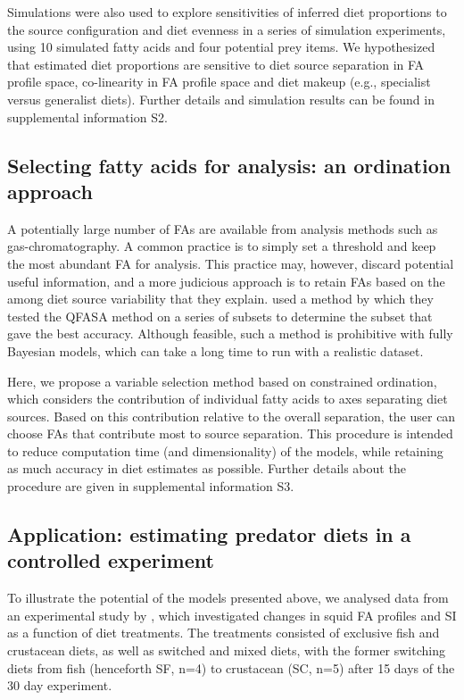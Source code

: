 \documentclass[fleqn,10pt]{wlpeerj}
\begin{document}
Simulations were also used to explore sensitivities of inferred diet proportions to the source
configuration and diet evenness in a series of
simulation experiments, using 10 simulated fatty acids and four potential prey items. We hypothesized that estimated diet
proportions are sensitive to diet source separation in FA profile space,
co-linearity in FA profile space \citep{blanchard_inference_2011} and diet makeup (e.g., specialist versus 
generalist diets). Further details and simulation results can be found
in supplemental information S2.

\subsection*{Selecting fatty acids for analysis: an ordination approach}

A potentially large number of FAs are available from analysis methods
such as gas-chromatography. A common practice is to simply set a
threshold and keep the most abundant FA for analysis. This practice
may, however, discard potential useful information, and a more
judicious approach is to retain FAs based on the among diet source
variability that they explain. \citet{wang_validating_2010} used a
method by which they tested the QFASA method on a series of subsets to
determine the subset that gave the best accuracy. Although feasible, such
a method is prohibitive with fully Bayesian models, which can take a long
time to run with a realistic dataset.

Here, we propose a variable selection method based on constrained
ordination, which considers the contribution of individual fatty
acids to axes separating diet sources. Based on this contribution
relative to the overall separation, the user can choose FAs
that contribute most to source separation. This procedure is intended
to reduce computation time (and dimensionality) of the models,
while retaining as much accuracy in diet estimates as possible. Further details about the
procedure are given in supplemental information S3.


\subsection*{Application: estimating predator diets in a controlled
  experiment}

To illustrate the potential of the models presented above, we analysed
data from an experimental study by
\citet{stowasser_experimental_2006}, which investigated changes in
squid FA profiles and SI as a function of diet treatments. The treatments consisted of
exclusive fish and crustacean diets, as well as switched and mixed
diets, with the former switching diets from fish (henceforth SF, n=4) to
crustacean (SC, n=5) after 15 days of the 30 day experiment. 
\end{document}
